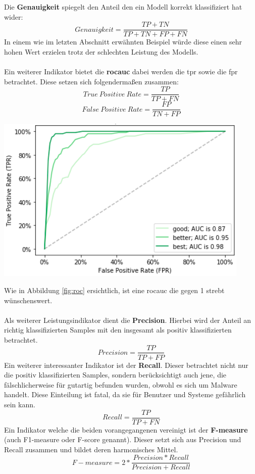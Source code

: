 \documentclass[
    12pt, %
    DIV10,
    ngerman, %
    a4paper, %
    oneside, %
    titlepage, %
    parskip=half, %
    headings=normal, %
    listof=totoc, %
    bibliography=totoc, %
    index=totoc, %
    captions=tableheading, %
    final %
]{scrreprt}
\begin{document}
Die \textbf{Genauigkeit} spiegelt den Anteil den ein Modell korrekt klassifiziert hat wider:
$$Genauigkeit = \frac{TP + TN}{TP + TN + FP + FN}$$ In einem wie im letzten Abschnitt erwähnten Beispiel würde diese einen sehr hohen Wert erzielen trotz der schlechten Leistung des Modells.
\\\\
Ein weiterer Indikator bietet die \textbf{\ac{rocauc}} dabei werden die \ac{tpr} sowie die \ac{fpr} betrachtet. Diese setzen sich folgenderma{\ss}en zusammen:
$$True\ Positive\ Rate = \frac{TP}{TP + FN}$$
$$False\ Positive\ Rate = \frac{FP}{TN + FP}$$
\begin{center}
\includegraphics[scale=0.6]{img/roc.png}
\label{fig:roc}
\end{center}
Wie in Abbildung \ref{fig:roc} ersichtlich, ist eine \ac{rocauc} die gegen 1 strebt wünschenswert.
\\\\
Als weiterer Leistungsindikator dient die \textbf{Precision}. Hierbei wird der Anteil an richtig klassifizierten Samples mit den insgesamt als positiv klassifizierten betrachtet.
$$Precision = \frac{TP}{TP + FP}$$
Ein weiterer interessanter Indikator ist der \textbf{Recall}. Dieser betrachtet nicht nur die positiv klassifizierten Samples, sondern berücksichtigt auch jene, die fälschlicherweise für gutartig befunden wurden, obwohl es sich um Malware handelt. Diese Einteilung ist fatal, da sie für Benutzer und Systeme gefährlich sein kann.
$$Recall = \frac{TP}{TP + FN}$$
Ein Indikator welche die beiden vorangegangenen vereinigt ist der \textbf{F-measure} (auch F1-measure oder F-score genannt).
Dieser setzt sich aus Precision und Recall zusammen und bildet deren harmonisches Mittel.
$$F-measure = 2*\frac{Precision * Recall}{Precision + Recall}$$
\end{document}
